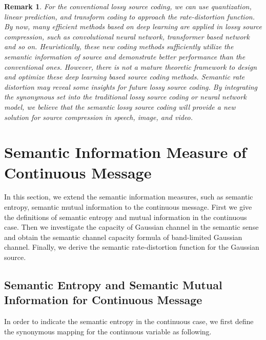\documentclass[12pt, draftclsnofoot,onecolumn]{IEEEtran}
\newtheorem{remark}{\bf{Remark}}
\begin{document}
\begin {remark}
For the conventional lossy source coding, we can use quantization, linear prediction, and transform coding to approach the rate-distortion function. By now, many efficient methods based on deep learning are applied in lossy source compression, such as convolutional neural network, transformer based network and so on. Heuristically, these new coding methods sufficiently utilize the semantic information of source and demonstrate better performance than the conventional ones. However, there is not a mature theoretic framework to design and optimize these deep learning based source coding methods. Semantic rate distortion may reveal some insights for future lossy source coding. By integrating the synonymous set into the traditional lossy source coding or neural network model, we believe that the semantic lossy source coding will provide a new solution for source compression in speech, image, and video.
\end {remark}
\section{Semantic Information Measure of Continuous Message}
\label{section_IX}

In this section, we extend the semantic information measures, such as semantic entropy, semantic mutual information to the continuous message. First we give the definitions of semantic entropy and mutual information in the continuous case. Then we investigate the capacity of Gaussian channel in the semantic sense and obtain the semantic channel capacity formula of band-limited Gaussian channel. Finally, we derive the semantic rate-distortion function for the Gaussian source.

\subsection{Semantic Entropy and Semantic Mutual Information for Continuous Message}
In order to indicate the semantic entropy in the continuous case, we first define the synonymous mapping for the continuous variable as following.
\end{document}
